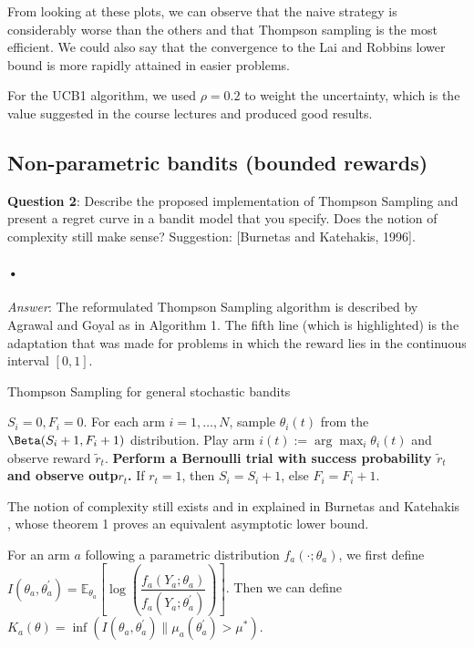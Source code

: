 \documentclass[a4paper]{article}
\begin{document}
From looking at these plots, we can observe that the naive strategy is considerably worse than the others and that Thompson sampling is the most efficient. We could also say that the convergence to the Lai and Robbins lower bound is more rapidly attained in easier problems.

For the UCB1 algorithm, we used $\rho = 0.2$ to weight the uncertainty, which is the value suggested in the course lectures and produced good results.

\subsection{Non-parametric bandits (bounded rewards)}

\textbf{Question 2}: Describe the proposed implementation of Thompson Sampling and present a regret curve in a bandit model that you specify. Does the notion of complexity still make sense? Suggestion: [Burnetas and Katehakis, 1996].
\paragraph{•}
\textit{Answer}:
The reformulated Thompson Sampling algorithm is described by Agrawal and Goyal\cite{AdaptedThompson} as in Algorithm 1. The fifth line (which is highlighted) is the adaptation that was made for problems in which the reward lies in the continuous interval $[0, 1]$.

\begin{algorithm}[h]
	\caption{Thompson Sampling for general stochastic bandits}
	$S_i=0, F_i=0$.
		\State For each arm $i=1,\ldots, N$, sample $\theta_i(t)$ from the $\Beta(S_i+1, F_i+1)$ distribution.
		\State Play arm $i(t) := \arg \max_i \theta_i(t)$ and observe reward $\tilde{r}_t$.
        \State \textbf{Perform a Bernoulli trial with success probability $\tilde{r}_t$ and observe outp$r_t$.}
		\State If $r_t=1$, then $S_{i}=S_i+1$, else $F_i=F_i+1$.
	\EndFor
\end{algorithm}

The notion of complexity still exists and in explained in Burnetas and Katehakis \cite{Complexity}, whose theorem 1 proves an equivalent asymptotic lower bound.

For an arm $a$ following a parametric distribution $f_a(\cdot; \theta_a)$, we first define $I(\theta_a, \theta_a^{'}) = \mathbb{E}_{\theta_a}[\log (\dfrac{f_a(Y_a; \theta_a)}{f_a(Y_a; \theta_a^{'})})]$. Then we can define $K_a(\theta) = \inf(I(\theta_a, \theta_a^{'}) \| \mu_a(\theta_a^{'}) > \mu^{*})$.
\end{document}
